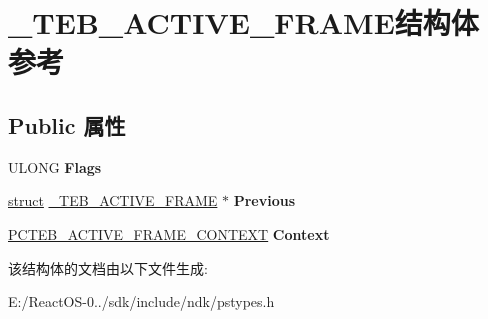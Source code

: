 \hypertarget{struct___t_e_b___a_c_t_i_v_e___f_r_a_m_e}{}\section{\+\_\+\+T\+E\+B\+\_\+\+A\+C\+T\+I\+V\+E\+\_\+\+F\+R\+A\+M\+E结构体 参考}
\label{struct___t_e_b___a_c_t_i_v_e___f_r_a_m_e}
\subsection*{Public 属性}
\begin{DoxyCompactItemize}
\item 
\mbox{\label{struct___t_e_b___a_c_t_i_v_e___f_r_a_m_e_aaa58642688b931eda68511e35e842c45}} 
U\+L\+O\+NG {\bfseries Flags}
\item 
\mbox{\label{struct___t_e_b___a_c_t_i_v_e___f_r_a_m_e_a3a63ae61ce3573b03d42ef404ae1affd}} 
\hyperlink{interfacestruct}{struct} \hyperlink{struct___t_e_b___a_c_t_i_v_e___f_r_a_m_e}{\+\_\+\+T\+E\+B\+\_\+\+A\+C\+T\+I\+V\+E\+\_\+\+F\+R\+A\+ME} $\ast$ {\bfseries Previous}
\item 
\mbox{\label{struct___t_e_b___a_c_t_i_v_e___f_r_a_m_e_a701b3a43c0c6c771cede2978559a028e}} 
\hyperlink{struct___t_e_b___a_c_t_i_v_e___f_r_a_m_e___c_o_n_t_e_x_t}{P\+C\+T\+E\+B\+\_\+\+A\+C\+T\+I\+V\+E\+\_\+\+F\+R\+A\+M\+E\+\_\+\+C\+O\+N\+T\+E\+XT} {\bfseries Context}
\end{DoxyCompactItemize}


该结构体的文档由以下文件生成\+:\begin{DoxyCompactItemize}
\item 
E\+:/\+React\+O\+S-\/0../sdk/include/ndk/pstypes.\+h\end{DoxyCompactItemize}
